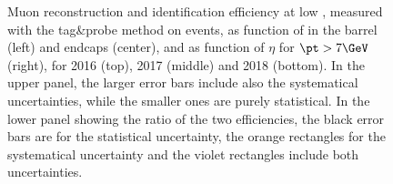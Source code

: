 \begin{figure}[htbp]
\begin{center}
    \caption{Muon reconstruction and identification efficiency at low \pt, measured with the tag\&probe method on \JPsi events, as function of \pt in the barrel (left) and endcaps (center), and as function of $\eta$ for $\pt > 7\GeV$ (right), for 2016 (top), 2017 (middle) and 2018 (bottom). In the upper panel, the larger error bars include also the systematical uncertainties, while the smaller ones are purely statistical. In the lower panel showing the ratio of the two efficiencies, the black error bars are for the statistical uncertainty, the orange rectangles for the systematical uncertainty and the violet rectangles include both uncertainties.}
    \label{fig:MuonIDEff_1}
\end{center}
\end{figure}


